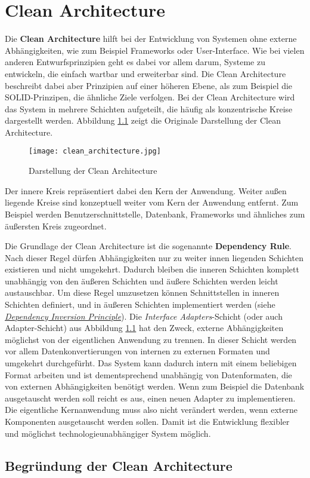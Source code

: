 \chapter{Clean Architecture}
\label{ch:Clean_Architecture}

Die \textbf{Clean Architecture} hilft bei der Entwicklung von Systemen ohne externe Abhängigkeiten, wie zum Beispiel Frameworks oder User-Interface.
Wie bei vielen anderen Entwurfsprinzipien geht es dabei vor allem darum, Systeme zu entwickeln, die einfach wartbar und erweiterbar sind.
Die Clean Architecture beschreibt dabei aber Prinzipien auf einer höheren Ebene, als zum Beispiel die SOLID-Prinzipen, die ähnliche Ziele verfolgen.
Bei der Clean Architecture wird das System in mehrere Schichten aufgeteilt, die häufig als konzentrische Kreise dargestellt werden.
Abbildung \ref{fig:clean_architecture_circles} zeigt die Originale Darstellung der Clean Architecture.
\begin{figure}[h]
    \texttt{[image: clean\_architecture.jpg]}
    \centering
    \caption{Darstellung der Clean Architecture \cite{martin_clean_architecture}}
    \label{fig:clean_architecture_circles}
\end{figure}


Der innere Kreis repräsentiert dabei den Kern der Anwendung.
Weiter außen liegende Kreise sind konzeptuell weiter vom Kern der Anwendung entfernt.
Zum Beispiel werden Benutzerschnittstelle, Datenbank, Frameworks und ähnliches zum äußersten Kreis zugeordnet.

Die Grundlage der Clean Architecture ist die sogenannte \textbf{Dependency Rule}.
Nach dieser Regel dürfen Abhängigkeiten nur zu weiter innen liegenden Schichten existieren und nicht umgekehrt.
Dadurch bleiben die inneren Schichten komplett unabhängig von den äußeren Schichten und äußere Schichten werden leicht austauschbar.
Um diese Regel umzusetzen können Schnittstellen in inneren Schichten definiert, und in äußeren Schichten implementiert werden (siehe \textit{\hyperref[sec:DIP]{Dependency Inversion Principle}}).
Die \textit{Interface Adapters}-Schicht (oder auch Adapter-Schicht) aus Abbildung \ref{fig:clean_architecture_circles} hat den Zweck, externe Abhängigkeiten möglichst von der eigentlichen Anwendung zu trennen.
In dieser Schicht werden vor allem Datenkonvertierungen von internen zu externen Formaten und umgekehrt durchgefürht.
Das System kann dadurch intern mit einem beliebigen Format arbeiten und ist dementsprechend unabhängig von Datenformaten, die von externen Abhängigkeiten benötigt werden.
Wenn zum Beispiel die Datenbank ausgetauscht werden soll reicht es aus, einen neuen Adapter zu implementieren.
Die eigentliche Kernanwendung muss also nicht verändert werden, wenn externe Komponenten ausgetauscht werden sollen.
Damit ist die Entwicklung flexibler und möglichst technologieunabhängiger System möglich.

\section{Begründung der Clean Architecture}

